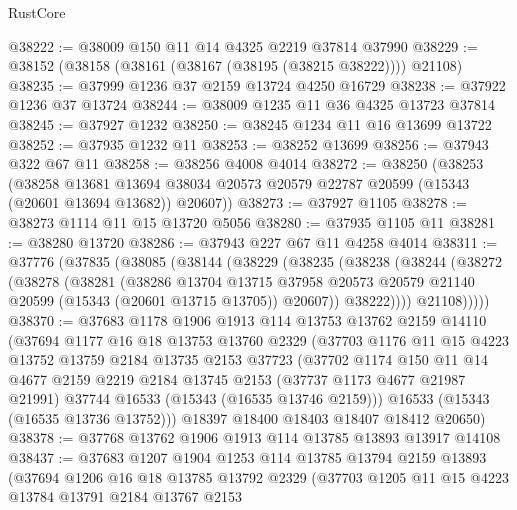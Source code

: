 \begin{lexlean}{RustCore}
\begin{coremodule}
@38222 := @38009 @150 @11 @14 @4325 @2219 @37814 @37990
@38229 := @38152 (@38158 (@38161 (@38167 (@38195 (@38215 @38222)))) @21108)
@38235 := @37999 @1236 @37 @2159 @13724 @4250 @16729
@38238 := @37922 @1236 @37 @13724
@38244 := @38009 @1235 @11 @36 @4325 @13723 @37814
@38245 := @37927 @1232
@38250 := @38245 @1234 @11 @16 @13699 @13722
@38252 := @37935 @1232 @11
@38253 := @38252 @13699
@38256 := @37943 @322 @67 @11
@38258 := @38256 @4008 @4014
@38272 := @38250
    (@38253
      (@38258
        @13681
        @13694
        @38034
        @20573
        @20579
        @22787
        @20599
        (@15343 (@20601 @13694 @13682))
        @20607))
@38273 := @37927 @1105
@38278 := @38273 @1114 @11 @15 @13720 @5056
@38280 := @37935 @1105 @11
@38281 := @38280 @13720
@38286 := @37943 @227 @67 @11 @4258 @4014
@38311 := @37776
    (@37835
      (@38085
        (@38144
          (@38229
            (@38235
              (@38238
                (@38244
                  (@38272
                    (@38278
                      (@38281
                        (@38286
                          @13704
                          @13715
                          @37958
                          @20573
                          @20579
                          @21140
                          @20599
                          (@15343 (@20601 @13715 @13705))
                          @20607))
                      @38222))))
              @21108)))))
@38370 := @37683
    @1178
    @1906
    @1913
    @114
    @13753
    @13762
    @2159
    @14110
    (@37694
      @1177
      @16
      @18
      @13753
      @13760
      @2329
      (@37703
        @1176
        @11
        @15
        @4223
        @13752
        @13759
        @2184
        @13735
        @2153
        @37723
        (@37702
          @1174
          @150
          @11
          @14
          @4677
          @2159
          @2219
          @2184
          @13745
          @2153
          (@37737 @1173 @4677 @21987 @21991)
          @37744
          @16533
          (@15343 (@16535 @13746 @2159)))
        @16533
        (@15343 (@16535 @13736 @13752)))
      @18397
      @18400
      @18403
      @18407
      @18412
      @20650)
@38378 := @37768 @13762 @1906 @1913 @114 @13785 @13893 @13917 @14108
@38437 := @37683
    @1207
    @1904
    @1253
    @114
    @13785
    @13794
    @2159
    @13893
    (@37694
      @1206
      @16
      @18
      @13785
      @13792
      @2329
      (@37703
        @1205
        @11
        @15
        @4223
        @13784
        @13791
        @2184
        @13767
        @2153

\end{coremodule}
\end{lexlean}
